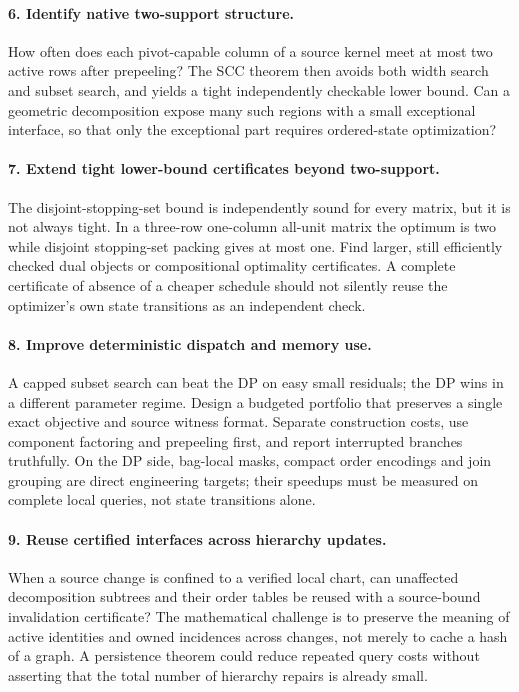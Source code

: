 \documentclass[11pt]{article}
\theoremstyle{definition}\newtheorem{definition}[theorem]{Definition}
\theoremstyle{remark}\newtheorem{remark}[theorem]{Remark}
\begin{document}
\paragraph{6. Identify native two-support structure.}
How often does each pivot-capable column of a source kernel meet at most two active rows after prepeeling? The SCC theorem then avoids both width search and subset search, and yields a tight independently checkable lower bound. Can a geometric decomposition expose many such regions with a small exceptional interface, so that only the exceptional part requires ordered-state optimization?

\paragraph{7. Extend tight lower-bound certificates beyond two-support.}
The disjoint-stopping-set bound is independently sound for every matrix, but it is not always tight. In a three-row one-column all-unit matrix the optimum is two while disjoint stopping-set packing gives at most one. Find larger, still efficiently checked dual objects or compositional optimality certificates. A complete certificate of absence of a cheaper schedule should not silently reuse the optimizer's own state transitions as an independent check.

\paragraph{8. Improve deterministic dispatch and memory use.}
A capped subset search can beat the DP on easy small residuals; the DP wins in a different parameter regime. Design a budgeted portfolio that preserves a single exact objective and source witness format. Separate construction costs, use component factoring and prepeeling first, and report interrupted branches truthfully. On the DP side, bag-local masks, compact order encodings and join grouping are direct engineering targets; their speedups must be measured on complete local queries, not state transitions alone.

\paragraph{9. Reuse certified interfaces across hierarchy updates.}
When a source change is confined to a verified local chart, can unaffected decomposition subtrees and their order tables be reused with a source-bound invalidation certificate? The mathematical challenge is to preserve the meaning of active identities and owned incidences across changes, not merely to cache a hash of a graph. A persistence theorem could reduce repeated query costs without asserting that the total number of hierarchy repairs is already small.
\end{document}
